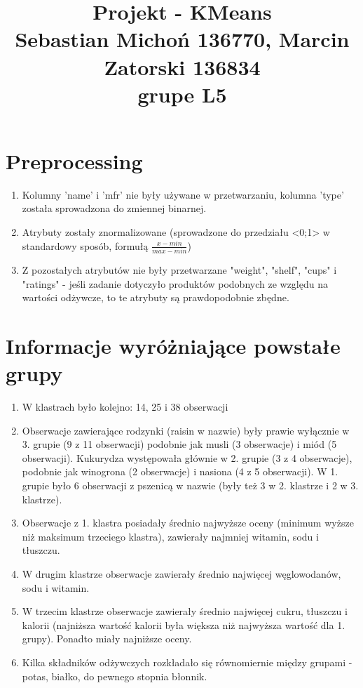 \documentclass[12pt]{article}
\begin{document}
\title{Projekt - KMeans\\
\large Sebastian Michoń 136770, Marcin Zatorski 136834\\
\large grupe L5}
\date{\vspace{-10ex}}
\maketitle

\section{Preprocessing}
\begin{enumerate}
	\item Kolumny 'name' i 'mfr' nie były używane w przetwarzaniu, kolumna 'type' została sprowadzona do zmiennej binarnej.
	\item Atrybuty zostały znormalizowane (sprowadzone do przedziału <0;1> w standardowy sposób, formułą \(\frac{x-min}{max-min}\))
	\item Z pozostałych atrybutów nie były przetwarzane "weight", "shelf", "cups" i "ratings" - jeśli zadanie dotyczyło produktów podobnych ze względu na wartości odżywcze, to te atrybuty są prawdopodobnie zbędne.
\end{enumerate}

\section{Informacje wyróżniające powstałe grupy}
\begin{enumerate}
	\item W klastrach było kolejno: 14, 25 i 38 obserwacji
	
	\item Obserwacje zawierające rodzynki (raisin w nazwie) były prawie wyłącznie w 3. grupie (9 z 11 obserwacji) podobnie jak musli (3 obserwacje) i miód (5 obserwacji). Kukurydza występowała głównie w 2. grupie (3 z 4 obserwacje), podobnie jak winogrona (2 obserwacje) i nasiona (4 z 5 obserwacji). W 1. grupie było 6 obserwacji z pszenicą w nazwie (były też 3 w 2. klastrze i 2 w 3. klastrze).
	
	\item Obserwacje z 1. klastra posiadały średnio najwyższe oceny (minimum wyższe niż maksimum trzeciego klastra), zawierały najmniej witamin, sodu i tłuszczu.
	
	\item W drugim klastrze obserwacje zawierały średnio najwięcej węglowodanów, sodu i witamin.
	
	\item W trzecim klastrze obserwacje zawierały średnio najwięcej cukru, tłuszczu i kalorii (najniższa wartość kalorii była większa niż najwyższa wartość dla 1. grupy). Ponadto miały najniższe oceny.
	
	\item Kilka składników odżywczych rozkładało się równomiernie między grupami - potas, białko, do pewnego stopnia błonnik.
\end{enumerate}
\end{document}
